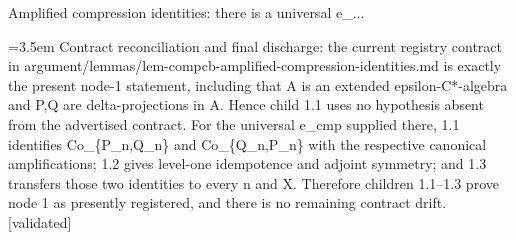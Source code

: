 \documentclass{article}
\newcommand{\step}[1]{\par\noindent\hangindent=3.5em\hangafter=1%
  \makebox[3.5em][l]{\textbf{#1.}}}
\newcommand{\steptag}[1]{\hfill{\small\textsf{[#1]}}}
\begin{document}
\begin{proofbox}{Amplified compression identities: there is a universal e\_...}
\step{1.4} Contract reconciliation and final discharge: the current registry contract in argument/lemmas/lem-compcb-amplified-compression-identities.md is exactly the present node-1 statement, including that A is an extended epsilon-C*-algebra and P,Q are delta-projections in A. Hence child 1.1 uses no hypothesis absent from the advertised contract. For the universal e\_cmp supplied there, 1.1 identifies Co\_\{P\_n,Q\_n\} and Co\_\{Q\_n,P\_n\} with the respective canonical amplifications; 1.2 gives level-one idempotence and adjoint symmetry; and 1.3 transfers those two identities to every n and X. Therefore children 1.1--1.3 prove node 1 as presently registered, and there is no remaining contract drift. \steptag{validated} \\[4pt]
\end{proofbox}
\end{document}
